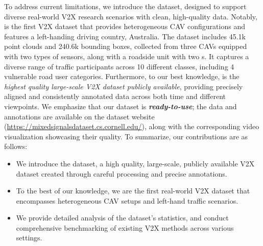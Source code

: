 To address current limitations, we introduce the \ours dataset, designed to support diverse real-world V2X research scenarios with clean, high-quality data. Notably, \ours is the first V2X dataset that provides heterogeneous CAV \lidar configurations and features a left-handing driving country, Australia. The dataset includes 45.1k point clouds and 240.6k bounding boxes, collected from three CAVs equipped with two types of \lidar sensors, along with a roadside unit with two {\lidar}s. It captures a diverse range of traffic participants across 10 different classes, including 4 vulnerable road user categories. Furthermore, to our best knowledge, \ours is the \textit{highest quality large-scale V2X dataset publicly available}, providing precisely aligned and consistently annotated data across both time and different viewpoints. We emphasize that our dataset is \textit{\textbf{ready-to-use}}; the data and annotations are available on the dataset website (\url{https://mixedsignalsdataset.cs.cornell.edu/}), along with the corresponding video visualization showcasing their quality.
To summarize, our contributions are as follows:
\begin{itemize} 
    \item We introduce the \ours dataset, a high quality, large-scale, publicly available V2X dataset created through careful processing and precise annotations.
    \item To the best of our knowledge, we are the first real-world V2X dataset that encompasses heterogeneous CAV \lidar setups and left-hand traffic scenarios.
    \item We provide detailed analysis of the dataset's statistics, and conduct comprehensive benchmarking of existing V2X methods across various settings.
\end{itemize}

